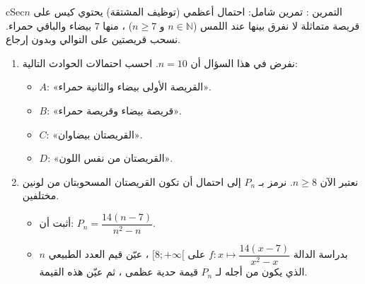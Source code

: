 \documentclass[12pt,a4paper]{article}
\newenvironment{BOX}[2]{\begin{otherlanguage}{english}\begin{arbox}{#1}{#2}}{\end{arbox}\end{otherlanguage}}
\newcounter{exo}
\newenvironment{tamrin}[1]{\stepcounter{exo}\begin{BOX}{cSec}{التمرين \theexo: #1}}{\end{BOX}}
\newcommand{\N}{\mathbb{N}}
\newenvironment{sq}{\begin{itemize}[leftmargin=2.4em,itemsep=3pt]}{\end{itemize}}
\newcommand{\qa}{\item[(أ)]}\newcommand{\qb}{\item[(ب)]}\newcommand{\qc}{\item[(جـ)]}\newcommand{\qd}{\item[(د)]}\newcommand{\qe}{\item[(هـ)]}
\begin{document}
\begin{tamrin}{تمرين شامل: احتمال أعظمي (توظيف المشتقة)}
يحتوي كيس على $n$ قريصة متماثلة لا نفرق بينها عند اللمس ($n\in\N$ و $n\ge7$) ، منها $7$ بيضاء والباقي حمراء. نسحب قريصتين على التوالي وبدون إرجاع.
\begin{enumerate}
\item نفرض في هذا السؤال أن $n=10$. احسب احتمالات الحوادث التالية:
\begin{sq}
\qa $A$: «القريصة الأولى بيضاء والثانية حمراء».
\qb $B$: «قريصة بيضاء وقريصة حمراء».
\qc $C$: «القريصتان بيضاوان».
\qd $D$: «القريصتان من نفس اللون».
\end{sq}
\item نعتبر الآن $n\ge8$. نرمز بـ $P_n$ إلى احتمال أن تكون القريصتان المسحوبتان من لونين مختلفين.
\begin{sq}
\qa أثبت أن: $P_n=\dfrac{14(n-7)}{n^2-n}$.
\qb بدراسة الدالة $f:x\mapsto\dfrac{14(x-7)}{x^2-x}$ على $[8;+\infty[$ ، عيّن قيم العدد الطبيعي $n$ الذي يكون من أجله لـ $P_n$ قيمة حدية عظمى ، ثم عيّن هذه القيمة.
\end{sq}
\end{enumerate}
\end{tamrin}
\end{document}
